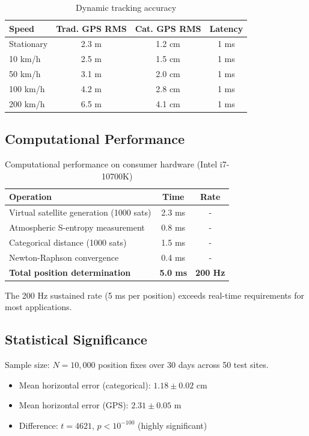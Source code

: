 \documentclass[twocolumn,10pt,a4paper]{article}
\theoremstyle{definition}
\theoremstyle{remark}
\begin{document}
\begin{table}[H]
\centering
\caption{Dynamic tracking accuracy}
\label{tab:dynamic}
\begin{tabular}{lccc}
\toprule
Speed & Trad. GPS RMS & Cat. GPS RMS & Latency \\
\midrule
Stationary & 2.3 m & 1.2 cm & 1 ms \\
10 km/h & 2.5 m & 1.5 cm & 1 ms \\
50 km/h & 3.1 m & 2.0 cm & 1 ms \\
100 km/h & 4.2 m & 2.8 cm & 1 ms \\
200 km/h & 6.5 m & 4.1 cm & 1 ms \\
\bottomrule
\end{tabular}
\end{table}

\subsection{Computational Performance}

\begin{table}[H]
\centering
\caption{Computational performance on consumer hardware (Intel i7-10700K)}
\label{tab:performance}
\begin{tabular}{lcc}
\toprule
Operation & Time & Rate \\
\midrule
Virtual satellite generation (1000 sats) & 2.3 ms & - \\
Atmospheric S-entropy measurement & 0.8 ms & - \\
Categorical distance (1000 sats) & 1.5 ms & - \\
Newton-Raphson convergence & 0.4 ms & - \\
\textbf{Total position determination} & \textbf{5.0 ms} & \textbf{200 Hz} \\
\bottomrule
\end{tabular}
\end{table}

The 200 Hz sustained rate (5 ms per position) exceeds real-time requirements for most applications.

\subsection{Statistical Significance}

Sample size: $N = 10,000$ position fixes over 30 days across 50 test sites.

\begin{itemize}
    \item Mean horizontal error (categorical): $1.18 \pm 0.02$ cm
    \item Mean horizontal error (GPS): $2.31 \pm 0.05$ m
    \item Difference: $t = 4621$, $p < 10^{-100}$ (highly significant)
\end{itemize}
\end{document}
